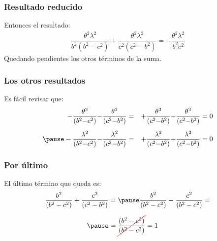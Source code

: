 \documentclass[12pt]{beamer}
\begin{document}
\begin{frame}
\frametitle{Resultado reducido}
Entonces el resultado:
\pause
\begin{align*}
\dfrac{\theta^{2} \lambda^{2}}{b^{2}(b^{2} - c^{2})} + \dfrac{\theta^{2} \lambda^{2}}{c^{2}(c^{2} - b^{2})} = - \dfrac{\theta^{2} \lambda^{2}}{b^{2} c^{2}}
\end{align*}
\pause
Quedando pendientes los otros términos de la suma.
\end{frame}
\begin{frame}
\frametitle{Los otros resultados}
Es fácil revisar que:
\pause
\begin{eqnarray*}
- \dfrac{\theta^{2}}{(b^{2} {-} c^{2})} {-} \dfrac{\theta^{2}}{(c^{2} {-} b^{2})} &=& + \dfrac{\theta^{2}}{(c^{2} {-} b^{2})} {-} \dfrac{\theta^{2}}{(c^{2} {-} b^{2})} = 0 \\[0.5em] \pause
- \dfrac{\lambda^{2}}{(b^{2} {-} c^{2})} {-} \dfrac{\lambda^{2}}{(c^{2} {-} b^{2})} &=& + \dfrac{\lambda^{2}}{(c^{2} {-} b^{2})} {-} \dfrac{\lambda^{2}}{(c^{2} {-} b^{2})} = 0
\end{eqnarray*}
\end{frame}
\begin{frame}
\frametitle{Por último}
El último término que queda es:
\pause
\begin{eqnarray*}
\begin{aligned}
\dfrac{b^{2}}{(b^{2} - c^{2})} + \dfrac{c^{2}}{(c^{2} - b^{2})} &= \pause \dfrac{b^{2}}{(b^{2} - c^{2})} - \dfrac{c^{2}}{(b^{2} - c^{2})} = \\[0.5em] \pause
&= \Cancel[red]{\dfrac{(b^{2} - c^{2})}{(b^{2} - c^{2})}} = 1
\end{aligned}
\end{eqnarray*}
\end{frame}  
\end{document}
